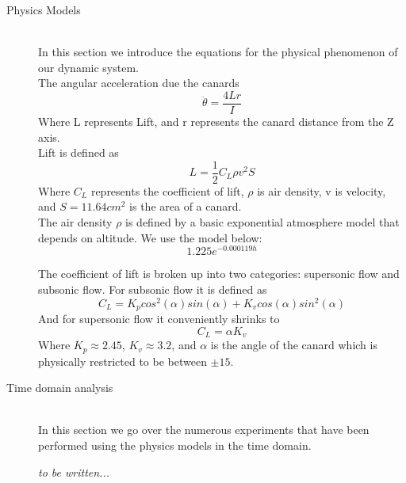 \documentclass[12pt]{article}
\begin{document}
\begin{description}
	\item[Physics Models] \hfill \\
	In this section we introduce the equations for the physical phenomenon of our dynamic system.\\
	
	The angular acceleration due the canards
	\begin{equation}
		\ddot{\theta} = \frac{4Lr}{I}
	\end{equation}
	Where L represents Lift, and r represents the canard distance from the Z axis.\\
	
	Lift is defined as
	\begin{equation}
		L = \frac{1}{2}C_{L}\rho v^2 S
	\end{equation}
	Where $C_{L}$ represents the coefficient of lift, $\rho$ is air density, v is velocity, and $S = 11.64cm^2$ is the area of a canard.\\
	
	The air density $\rho$ is defined by a basic exponential atmosphere model that depends on altitude. We use the model below:
	\begin{equation}
		1.225e^{-0.000119h}
	\end{equation}
	
	The coefficient of lift is broken up into two categories: supersonic flow and subsonic flow. For subsonic flow it is defined as
	\begin{equation}
		C_{L} = K_{p} cos^2(\alpha) sin(\alpha) + K_{v} cos(\alpha) sin^2(\alpha)
	\end{equation}
	And for supersonic flow it conveniently shrinks to
	\begin{equation}
		C_{L} = \alpha K_{v}
	\end{equation}
	Where $K_{p} \approx 2.45$, $K_{v} \approx 3.2$, and $\alpha$ is the angle of the canard which is physically restricted to be between $\pm15$\textdegree.
	
\end{description}

\begin{description}
	\item[Time domain analysis] \hfill \\
		In this section we go over the numerous experiments that have been performed using the physics models in the time domain.
		
		\textit{to be written...}
\end{description}
 
\end{document}
